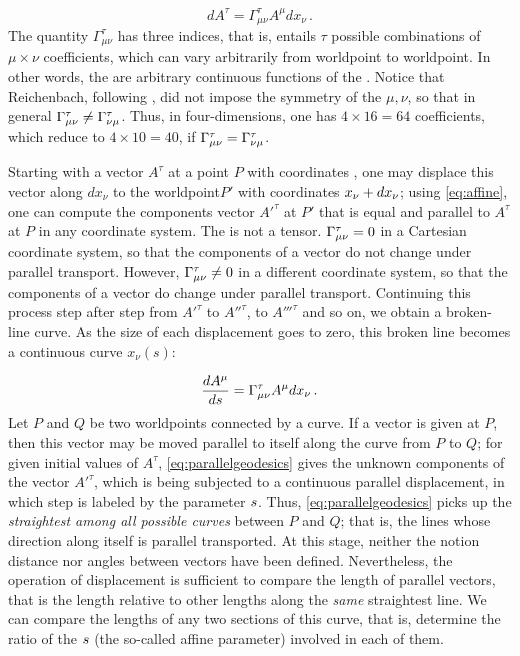\documentclass[submitted]{article}
\newcommand{\wpo}{worldpoint\xspace}
\begin{document}
\begin{equation}\label{eq:affine}
dA^\tau = \Gamma^\tau_{\mu\nu}A^{\mu} dx_\nu\,.
\end{equation}
%
The quantity $\Gamma^\tau_{\mu\nu}$ has three indices, that is, entails $\tau$ possible combinations of $\mu \times \nu$ coefficients, which can vary arbitrarily from \wpo to \wpo. In other words, the \Gtmn are arbitrary continuous functions of the \xn. Notice that Reichenbach, following \citet{Schouten1922a}, did not impose the symmetry of the $\mu,\nu$, so that in general $\Gamma^\tau_{\mu\nu} \neq \Gamma^\tau_{\nu\mu}$. Thus, in four-dimensions, one has $4 \times 16 = 64$ coefficients, which reduce to $4 \times 10 = 40$, if $\Gamma^\tau_{\mu\nu} = \Gamma^\tau_{\nu\mu}$.

Starting with a vector $A^\tau$ at a point $P$ with coordinates \xn, one may displace this vector along $dx_\nu$ to the \wpo $P'$ with coordinates $x_{\nu}+dx_\nu$; using \cref{eq:affine}, one can compute the components vector $A'^\tau$ at $P'$ that is equal and parallel to $A^\tau$ at $P$ in any coordinate system. The \Gtmn is not a tensor. $\Gamma^\tau_{\mu\nu}=0$ in a Cartesian coordinate system, so that the components of a vector do not change under parallel transport. However, $\Gamma^\tau_{\mu\nu}\neq0$ in a different coordinate system, so that the components of a vector do change under parallel transport. Continuing this process step after step from $A'^\tau$ to $A''^\tau$, to $A'''^\tau$ and so on, we obtain a broken-line curve. As the size of each displacement goes to zero, this broken line becomes a continuous curve $x_\nu(s)$: 

\begin{equation}\label{eq:parallelgeodesics}
\frac{d {A}^{\mu}}{ds} = \Gamma^\tau_{\mu\nu}A^{\mu} dx_\nu\,. 
\end{equation}
%
Let $P$ and $Q$ be two \wpo{}s connected by a curve. If a vector is given at $P$, then this vector may be moved parallel to itself along the curve from $P$ to $Q$; for given initial values of $A^\tau$, \cref{eq:parallelgeodesics} gives the unknown components of the vector $A'^\tau$, which is being subjected to a continuous parallel displacement, in which step is labeled by the parameter $s$. Thus, \cref{eq:parallelgeodesics} picks up the \emph{straightest among all possible curves} between $P$ and $Q$; that is, the lines whose direction along itself is parallel transported. At this stage, neither the notion distance nor angles between vectors have been defined. Nevertheless, the operation of displacement is sufficient to compare the length of parallel vectors, that is the length relative to other lengths along the \emph{same} straightest line. We can compare the lengths of any two sections of this curve, that is, determine the ratio of the  $s$ (the so-called affine parameter) involved in each of them.
\end{document}
